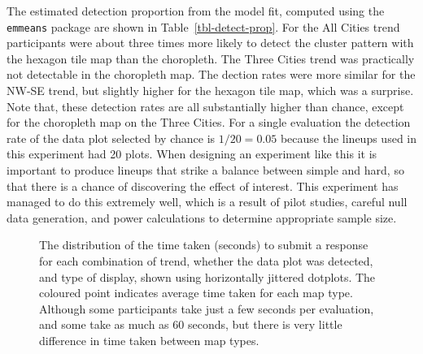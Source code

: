 \documentclass[
doublespace,
  times]{anzsauth}
\begin{document}
The estimated detection proportion from the model fit, computed using
the \texttt{emmeans} package \citep{Lenth2025} are shown in
Table~\ref{tbl-detect-prop}. For the All Cities trend participants were
about three times more likely to detect the cluster pattern with the
hexagon tile map than the choropleth. The Three Cities trend was
practically not detectable in the choropleth map. The dection rates were
more similar for the NW-SE trend, but slightly higher for the hexagon
tile map, which was a surprise. Note that, these detection rates are all
substantially higher than chance, except for the choropleth map on the
Three Cities. For a single evaluation the detection rate of the data
plot selected by chance is \(1/20=0.05\) because the lineups used in
this experiment had 20 plots. When designing an experiment like this it
is important to produce lineups that strike a balance between simple and
hard, so that there is a chance of discovering the effect of interest.
This experiment has managed to do this extremely well, which is a result
of pilot studies, careful null data generation, and power calculations
to determine appropriate sample size.

\begin{figure}


\caption{\label{fig-beeswarm}The distribution of the time taken
(seconds) to submit a response for each combination of trend, whether
the data plot was detected, and type of display, shown using
horizontally jittered dotplots. The coloured point indicates average
time taken for each map type. Although some participants take just a few
seconds per evaluation, and some take as much as 60 seconds, but there
is very little difference in time taken between map types.}

\end{figure}%
\end{document}
